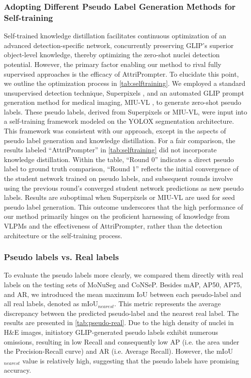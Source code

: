 \documentclass[journal,twoside,web]{ieeecolor}
\begin{document}
\subsubsection{Adopting Different Pseudo Label Generation Methods for Self-training} Self-trained knowledge distillation facilitates continuous optimization of an advanced detection-specific network, concurrently preserving GLIP's superior object-level knowledge, thereby optimizing the zero-shot nuclei detection potential. However, the primary factor enabling our method to rival fully supervised approaches is the efficacy of AttriPrompter. To elucidate this point, we outline the optimization process in \autoref{tab:selftraining}. We employed a standard unsupervised detection technique, Superpixels \cite{achanta2012slic}, and an automated GLIP prompt generation method for medical imaging, MIU-VL \cite{qin2022medical}, to generate zero-shot pseudo labels. These pseudo labels, derived from Superpixels or MIU-VL, were input into a self-training framework modeled on the YOLOX segmentation architecture. This framework was consistent with our approach, except in the aspects of pseudo label generation and knowledge distillation. For a fair comparison, the results labeled ``AttriPrompter'' in \autoref{tab:selftraining} did not incorporate knowledge distillation. Within the table, ``Round 0'' indicates a direct pseudo label to ground truth comparison, ``Round 1'' reflects the initial convergence of the student network trained on pseudo labels, and subsequent rounds involve using the previous round's converged student network predictions as new pseudo labels. Results are suboptimal when Superpixels or MIU-VL are used for seed pseudo label generation. This outcome underscores that the high performance of our method primarily hinges on the proficient harnessing of knowledge from VLPMs and the effectiveness of AttriPrompter, rather than the detection architecture or the self-training process. %


\subsubsection{Pseudo labels vs. Real labels} To evaluate the pseudo labels more clearly, we compared them directly with real labels on the testing sets of MoNuSeg and CoNSeP. Besides mAP, AP50, AP75, and AR, we introduced the mean maximum IoU between each pseudo-label and all real labels, denoted as mIoU$_{nearest}$. This metric represents the average discrepancy between the predicted pseudo-label and the nearest real label. The results are presented in \autoref{tab:pseudo-real}. Due to the high density of nuclei in H\&E images, initiatory GLIP-generated pseudo labels exhibit numerous omissions, resulting in low Recall and consequently low AP (i.e. the area under the Precision-Recall curve) and AR (i.e. Average Recall). However, the mIoU$_{nearest}$ value is relatively high, suggesting that the pseudo labels have promising accuracy.
\end{document}
